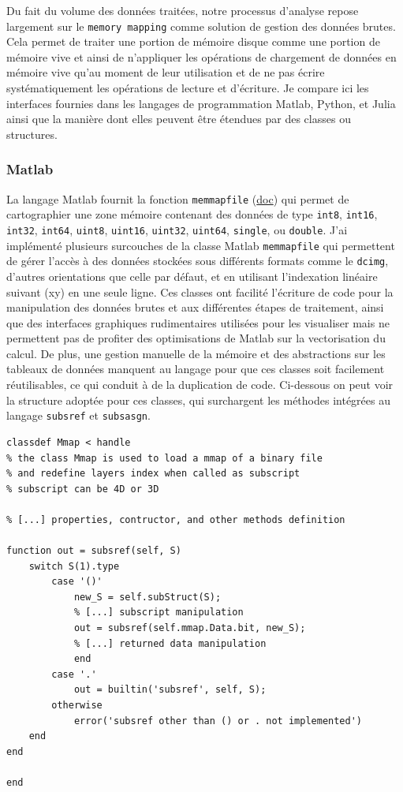 Du fait du volume des données traitées, notre processus d'analyse repose largement sur le \verb|memory mapping| comme solution de gestion des données brutes. Cela permet de traiter une portion de mémoire disque comme une portion de mémoire vive et ainsi de n'appliquer les opérations de chargement de données en mémoire vive qu'au moment de leur utilisation et de ne pas écrire systématiquement les opérations de lecture et d'écriture. Je compare ici les interfaces fournies dans les langages de programmation Matlab, Python, et Julia ainsi que la manière dont elles peuvent être étendues par des classes ou structures.

\subsubsection{Matlab}

La langage Matlab fournit la fonction \verb|memmapfile| (\href{https://fr.mathworks.com/help/matlab/ref/memmapfile.html}{doc}) qui permet de cartographier une zone mémoire contenant des données de type \verb|int8|, \verb|int16|, \verb|int32|, \verb|int64|, \verb|uint8|, \verb|uint16|, \verb|uint32|, \verb|uint64|, \verb|single|, ou \verb|double|.
J'ai implémenté plusieurs surcouches de la classe Matlab \verb|memmapfile| qui permettent de gérer l'accès à des données stockées sous différents formats comme le \verb|dcimg|, d'autres orientations que celle par défaut, et en utilisant l'indexation linéaire suivant (xy) en une seule ligne. Ces classes ont facilité l'écriture de code pour la manipulation des données brutes et aux différentes étapes de traitement, ainsi que des interfaces graphiques rudimentaires utilisées pour les visualiser mais ne permettent pas de profiter des optimisations de Matlab sur la vectorisation du calcul.
De plus, une gestion manuelle de la mémoire et des abstractions sur les tableaux de données manquent au langage pour que ces classes soit facilement réutilisables, ce qui conduit à de la duplication de code. Ci-dessous on peut voir la structure adoptée pour ces classes, qui surchargent les méthodes intégrées au langage \verb|subsref| et \verb|subsasgn|.


\matlabstyle
\begin{lstlisting}
classdef Mmap < handle
% the class Mmap is used to load a mmap of a binary file
% and redefine layers index when called as subscript
% subscript can be 4D or 3D

% [...] properties, contructor, and other methods definition

function out = subsref(self, S)        
    switch S(1).type
        case '()'
            new_S = self.subStruct(S);
            % [...] subscript manipulation
            out = subsref(self.mmap.Data.bit, new_S);
            % [...] returned data manipulation
            end
        case '.'
            out = builtin('subsref', self, S);
        otherwise
            error('subsref other than () or . not implemented')
    end        
end

end
\end{lstlisting}

